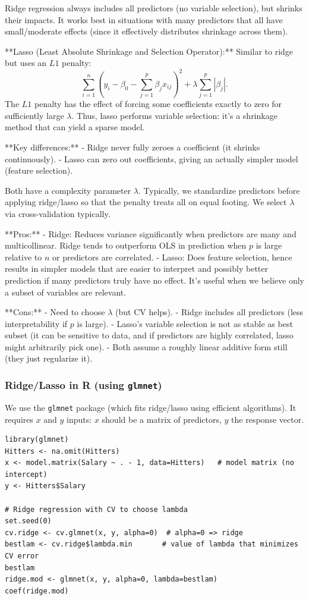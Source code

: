 \documentclass[11pt]{article}
\begin{document}
Ridge regression always includes all predictors (no variable selection), but shrinks their impacts. It works best in situations with many predictors that all have small/moderate effects (since it effectively distributes shrinkage across them).

**Lasso (Least Absolute Shrinkage and Selection Operator):** Similar to ridge but uses an $L1$ penalty:
\[ \sum_{i=1}^n (y_i - \beta_0 - \sum_{j=1}^p \beta_j x_{ij})^2 + \lambda \sum_{j=1}^p |\beta_j|. \]
The $L1$ penalty has the effect of forcing some coefficients exactly to zero for sufficiently large $\lambda$. Thus, lasso performs variable selection: it's a shrinkage method that can yield a sparse model.

**Key differences:**
- Ridge never fully zeroes a coefficient (it shrinks continuously).
- Lasso can zero out coefficients, giving an actually simpler model (feature selection).

Both have a complexity parameter $\lambda$. Typically, we standardize predictors before applying ridge/lasso so that the penalty treats all on equal footing. We select $\lambda$ via cross-validation typically.

**Pros:** 
- Ridge: Reduces variance significantly when predictors are many and multicollinear. Ridge tends to outperform OLS in prediction when $p$ is large relative to $n$ or predictors are correlated. 
- Lasso: Does feature selection, hence results in simpler models that are easier to interpret and possibly better prediction if many predictors truly have no effect. It's useful when we believe only a subset of variables are relevant.

**Cons:** 
- Need to choose $\lambda$ (but CV helps). 
- Ridge includes all predictors (less interpretability if $p$ is large). 
- Lasso's variable selection is not as stable as best subset (it can be sensitive to data, and if predictors are highly correlated, lasso might arbitrarily pick one).
- Both assume a roughly linear additive form still (they just regularize it).

\subsubsection*{Ridge/Lasso in R (using \texttt{glmnet})}
We use the \texttt{glmnet} package (which fits ridge/lasso using efficient algorithms). It requires $x$ and $y$ inputs: $x$ should be a matrix of predictors, $y$ the response vector.

\begin{verbatim}
library(glmnet)
Hitters <- na.omit(Hitters)
x <- model.matrix(Salary ~ . - 1, data=Hitters)   # model matrix (no intercept)
y <- Hitters$Salary

# Ridge regression with CV to choose lambda
set.seed(0)
cv.ridge <- cv.glmnet(x, y, alpha=0)  # alpha=0 => ridge
bestlam <- cv.ridge$lambda.min       # value of lambda that minimizes CV error
bestlam
ridge.mod <- glmnet(x, y, alpha=0, lambda=bestlam)
coef(ridge.mod)
\end{verbatim}
\end{document}
